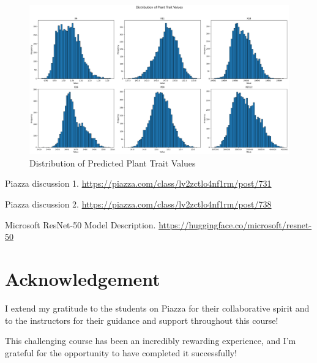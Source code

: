 \documentclass{article}
\begin{document}
\begin{figure}[h]
    \centering
    \includegraphics[width=\textwidth]{predicted_distribution.png}
    \caption{Distribution of Predicted Plant Trait Values}
    \label{fig:pred_dist}
\end{figure}

\begin{thebibliography}{9}

Piazza discussion 1.
\url{https://piazza.com/class/lv2zctlo4nf1rm/post/731}

Piazza discussion 2.
\url{https://piazza.com/class/lv2zctlo4nf1rm/post/738}

Microsoft ResNet-50 Model Description.
\url{https://huggingface.co/microsoft/resnet-50}

\end{thebibliography}

\section*{Acknowledgement}

I extend my gratitude to the students on Piazza for their collaborative spirit and to the instructors for their guidance and support throughout this course!

This challenging course has been an incredibly rewarding experience, and I'm grateful for the opportunity to have completed it successfully!
\end{document}
